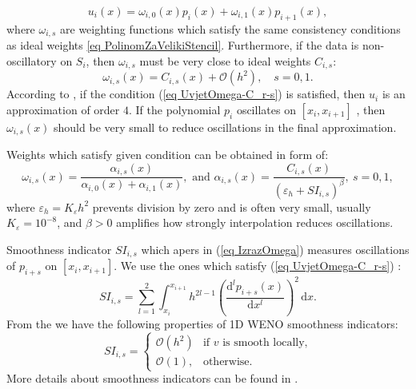 	\begin{equation}\label{eq TezinskiPolinom1d}
		u_i(x)=\omega_{i,0}(x) p_{i}(x)+ \omega_{i,1}(x) p_{i+1}(x),
	\end{equation}
	where $\omega_{i,s}$ are weighting functions which satisfy the same consistency conditions as ideal weights \eqref{eq PolinomZaVelikiStencil}. Furthermore, if the data is non-oscillatory on $S_i$, then $\omega_{i,s}$ must be very close to ideal weights  $C_{i,s}$:
	\begin{equation}\label{eq UvjetOmega-C_r-s}
		\omega_{i,s}(x)=C_{i,s}(x)+\mathcal{O}(h^{2}), \quad
		s=0,1.
	\end{equation}
	According to  \cite{shu_2020}, if the condition (\ref{eq UvjetOmega-C_r-s}) is satisfied, then
	$u_i$ is an approximation of order $4$. If the polynomial $p_i$ oscillates on 
	$[x_i,x_{i+1}]$ , then $\omega_{i,s}(x)$ should be very small to reduce oscillations in the final approximation. 
	
	Weights which satisfy given condition can be obtained in form of:
	\begin{equation}\label{eq IzrazOmega}
		\omega_{i,s}(x)=\frac{\alpha_{i,s}(x)}{\alpha_{i,0}(x)+\alpha_{i,1}(x)},\textrm{ and }
		\alpha_{i,s}(x)=\frac{C_{i,s}(x)}{\left(\varepsilon_h+SI_{i,s}\right)^{\beta}},\ s=0,1,
	\end{equation}
%		
	where $\varepsilon_h=K_\varepsilon h^2$ prevents division by zero and is often very small, usually $K_\varepsilon=10^{-8}$, and $\beta>0$ amplifies how strongly interpolation reduces oscillations. 
	
	Smoothness indicator $SI_{i,s}$ which apers in (\ref{eq
		IzrazOmega}) measures oscillations of  $p_{i+s}$ on $[x_i,x_{i+1}]$.
	We use %
	the ones which satisfy (\ref{eq UvjetOmega-C_r-s}) :
	\begin{equation*}%
		SI_{i,s}=\sum_{l=1}^{2} \int_{x_i}^{x_{i+1}} h^{2l-1}
		\left( \frac{\textrm{d}^{l}p_{i+s}(x)}{\textrm{d}x^{l}} \right)^{2} \,\textrm{d}x.
	\end{equation*}
	From the \cite{Liu2009} we have the following properties of 1D WENO smoothness indicators:
	\begin{equation}\label{eq: SIporperties}
		SI_{i,s}= 
		\begin{cases}
			\mathcal{O}\left(h^2\right)& \text{if } v \text{ is smooth locally,}\\
			\mathcal{O}\left(1\right),              & \text{otherwise.}
		\end{cases}
	\end{equation}
	More details about smoothness indicators can be found in \cite{shu_2020,Liu2009}.%
	
